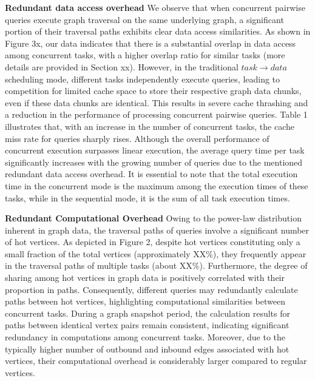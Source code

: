 \documentclass[lettersize,journal]{IEEEtran} %
\begin{document}
{\bf{Redundant data access overhead}} We observe that when concurrent pairwise queries execute graph traversal on the same underlying graph, a significant portion of their traversal paths exhibits clear data access similarities. As shown in Figure 3x, our data indicates that there is a substantial overlap in data access among concurrent tasks, with a higher overlap ratio for similar tasks (more details are provided in Section xx). However, in the traditional $task \rightarrow data$ scheduling mode, different tasks independently execute queries, leading to competition for limited cache space to store their respective graph data chunks, even if these data chunks are identical. This results in severe cache thrashing and a reduction in the performance of processing concurrent pairwise queries. Table 1 illustrates that, with an increase in the number of concurrent tasks, the cache miss rate for queries sharply rises. Although the overall performance of concurrent execution surpasses linear execution, the average query time per task significantly increases with the growing number of queries due to the mentioned redundant data access overhead. It is essential to note that the total execution time in the concurrent mode is the maximum among the execution times of these tasks, while in the sequential mode, it is the sum of all task execution times.



{\bf{Redundant Computational Overhead}} Owing to the power-law distribution inherent in graph data, the traversal paths of queries involve a significant number of hot vertices. As depicted in Figure 2, despite hot vertices constituting only a small fraction of the total vertices (approximately XX\%), they frequently appear in the traversal paths of multiple tasks (about XX\%). Furthermore, the degree of sharing among hot vertices in graph data is positively correlated with their proportion in paths. Consequently, different queries may redundantly calculate paths between hot vertices, highlighting computational similarities between concurrent tasks. During a graph snapshot period, the calculation results for paths between identical vertex pairs remain consistent, indicating significant redundancy in computations among concurrent tasks. Moreover, due to the typically higher number of outbound and inbound edges associated with hot vertices, their computational overhead is considerably larger compared to regular vertices.
\end{document}
